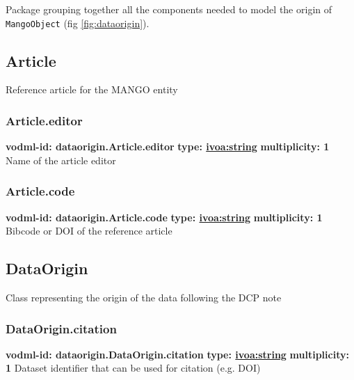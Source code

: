 
  Package grouping together all the components needed to model the origin of \texttt{MangoObject} (fig \ref{fig:dataorigin}).

  \subsection{Article}
  \label{sect:dataorigin.Article}
    Reference article for the MANGO entity

    \subsubsection{Article.editor}
      \textbf{vodml-id: dataorigin.Article.editor} \newline
      \textbf{type: \hyperref[sect:ivoa]{ivoa:string}} \newline
      \textbf{multiplicity: 1} \newline
      Name of the article editor

    \subsubsection{Article.code}
      \textbf{vodml-id: dataorigin.Article.code} \newline
      \textbf{type: \hyperref[sect:ivoa]{ivoa:string}} \newline
      \textbf{multiplicity: 1} \newline
      Bibcode or DOI of the reference article

  \subsection{DataOrigin}
  \label{sect:dataorigin.DataOrigin}
    Class representing the origin of the data following the DCP note

    \subsubsection{DataOrigin.citation}
      \textbf{vodml-id: dataorigin.DataOrigin.citation} \newline
      \textbf{type: \hyperref[sect:ivoa]{ivoa:string}} \newline
      \textbf{multiplicity: 1} \newline
      Dataset identifier that can be used for citation (e.g. DOI)

